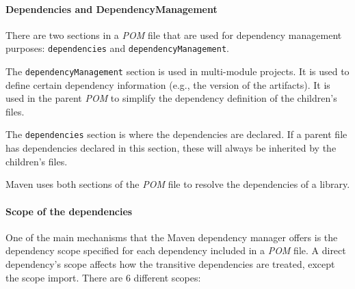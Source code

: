 \paragraph{Dependencies and DependencyManagement}
There are two sections in a \textit{POM} file that are used for dependency management purposes: \texttt{dependencies} and \texttt{dependencyManagement}.

The \texttt{dependencyManagement} section is used in multi-module projects. It is used to define certain dependency information (e.g., the version of the artifacts). It is used in the parent \textit{POM} to simplify the dependency definition of the children's files.

The \texttt{dependencies} section is where the dependencies are declared. If a parent file has dependencies declared in this section, these will always be inherited by the children's files.

Maven uses both sections of the \textit{POM} file to resolve the dependencies of a library.

\paragraph{Scope of the dependencies}
One of the main mechanisms that the Maven dependency manager offers is the dependency scope specified for each dependency included in a \textit{POM} file. A direct dependency's scope affects how the transitive dependencies are treated, except the scope import. There are 6 different scopes:

